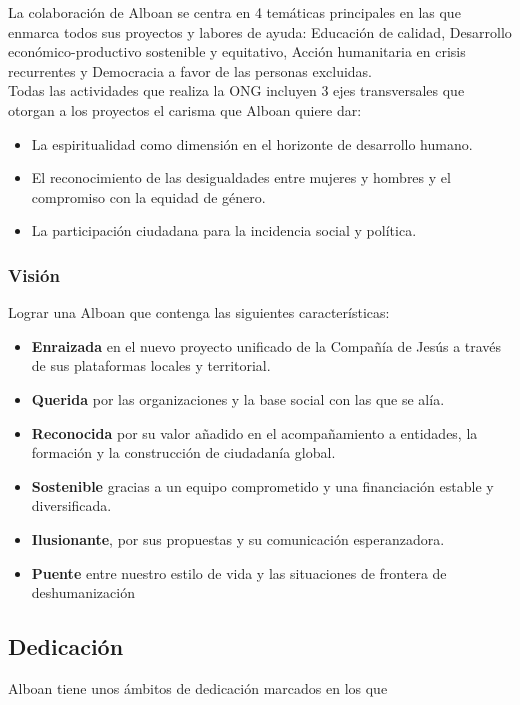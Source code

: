 La colaboración de Alboan se centra en 4 temáticas principales en las que enmarca todos sus proyectos y labores de ayuda: Educación de calidad, Desarrollo económico-productivo sostenible y equitativo, Acción humanitaria en crisis recurrentes y Democracia a favor de las personas excluidas.\\

Todas las actividades que realiza la ONG incluyen 3 ejes transversales que otorgan a los proyectos el carisma que Alboan quiere dar:
\begin{itemize}
	\item La espiritualidad como dimensión en el horizonte de desarrollo humano.
	\item El reconocimiento de las desigualdades entre mujeres y hombres y el compromiso con la equidad de género.
	\item La participación ciudadana para la incidencia social y política.
\end{itemize}

\subsubsection{Visión}

Lograr una Alboan que contenga las siguientes características:
\begin{itemize}
	\item \textbf{Enraizada} en el nuevo proyecto unificado de la Compañía de Jesús a través de sus plataformas locales y territorial.
	\item \textbf{Querida} por las organizaciones y la base social con las que se alía.
	\item \textbf{Reconocida} por su valor añadido en el acompañamiento a entidades, la
	formación y la construcción de ciudadanía global.
	\item \textbf{Sostenible} gracias a un equipo comprometido y una financiación estable y
	diversificada.
	\item \textbf{Ilusionante}, por sus propuestas y su comunicación esperanzadora.
	\item \textbf{Puente} entre nuestro estilo de vida y las situaciones de frontera de
	deshumanización
\end{itemize}


\subsection{Dedicación}

Alboan tiene unos ámbitos de dedicación marcados en los que

